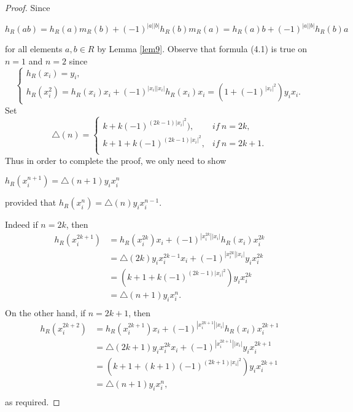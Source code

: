 \documentclass[a4paper,10pt]{amsart}
\theoremstyle{definition}
\theoremstyle{remark}
\numberwithin{equation}{section}
\begin{document}
\begin{proof}
Since
\begin{center}
$h_R(ab)=h_R(a)m_R(b)+(-1)^{|a||b|}h_R(b)m_R(a)=h_R(a)b+(-1)^{|a||b|}h_R(b)a$
\end{center}
for all elements $a, b\in R$ by Lemma \ref{lem9}. Observe that formula
(4.1) is true on $n=1$ and $n=2$ since
\begin{equation*}
   \begin{cases}
   h_R(x_i)=y_i,\\
   h_R(x_i^2)=h_R(x_i)x_i+(-1)^{|x_i||x_i|}h_R(x_i)x_i=(1+(-1)^{|x_i|^2})y_ix_i.
   \end{cases}
\end{equation*}
Set
\begin{equation}
\bigtriangleup (n)=
   \begin{cases}
   k+k(-1)^{(2k-1)|x_i|^2}), &if~n=2k,\\
   k+1+k(-1)^{(2k-1)|x_i|^2}, &if~n=2k+1.\nonumber\\
   \end{cases}
\end{equation}
Thus in order to complete the proof, we only
need to show
\begin{center}
$h_R(x_i^{n+1})=\bigtriangleup (n+1)y_ix_i^{n}$
\end{center} provided that $h_R(x_i^{n})=\bigtriangleup (n)y_ix_i^{n-1}$.

Indeed if $n=2k$, then
\begin{equation}
\begin{split}
h_R(x_i^{2k+1})&=h_R(x_i^{2k})x_i+(-1)^{|x_i^{2k}||x_i|}h_R(x_i)x_i^{2k}\\
&=\bigtriangleup (2k)y_ix_i^{2k-1}x_i+(-1)^{|x_i^{2k}||x_i|}y_ix_i^{2k}\\
&=(k+1+k(-1)^{(2k-1)|x_i|^2})y_ix_i^{2k}\\&=\bigtriangleup (n+1)y_ix_i^{n}.\\
\end{split}\nonumber
\end{equation}
On the other hand, if $n=2k+1$, then
\begin{equation}
\begin{split}
h_R(x_i^{2k+2})&=h_R(x_i^{2k+1})x_i+(-1)^{|x_i^{2k+1}||x_i|}h_R(x_i)x_i^{2k+1}\\
&=\bigtriangleup (2k+1)y_ix_i^{2k}x_i+(-1)^{|x_i^{2k+1}||x_i|}y_ix_i^{2k+1}\\
&=(k+1+(k+1)(-1)^{(2k+1)|x_i|^2})y_ix_i^{2k+1}\\&=\bigtriangleup (n+1)y_ix_i^{n},\\
\end{split}\nonumber
\end{equation}
as required.
\end{proof}
\end{document}
